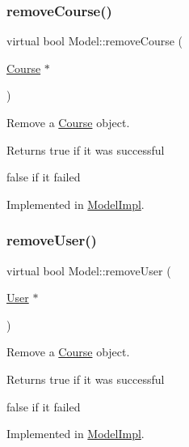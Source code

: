 \mbox{\label{classModel_acc20a58c9a9c7506b06df890e287433e}} 
\subsubsection{\texorpdfstring{remove\+Course()}{removeCourse()}}
{\footnotesize\ttfamily virtual bool Model\+::remove\+Course (\begin{DoxyParamCaption}\item[{\hyperlink{classCourse}{Course} $\ast$}]{ }\end{DoxyParamCaption})\hspace{0.3cm}{\ttfamily [pure virtual]}}



Remove a \hyperlink{classCourse}{Course} object. 

\begin{DoxyReturn}{Returns}
true if it was successful 

false if it failed 
\end{DoxyReturn}


Implemented in \hyperlink{classModelImpl_ae46076a7e4b54d24ba15fb2eb8e7f33d}{Model\+Impl}.

\mbox{\label{classModel_ad217703837ecec908995225f6de1bfca}} 
\subsubsection{\texorpdfstring{remove\+User()}{removeUser()}}
{\footnotesize\ttfamily virtual bool Model\+::remove\+User (\begin{DoxyParamCaption}\item[{\hyperlink{classUser}{User} $\ast$}]{ }\end{DoxyParamCaption})\hspace{0.3cm}{\ttfamily [pure virtual]}}



Remove a \hyperlink{classCourse}{Course} object. 

\begin{DoxyReturn}{Returns}
true if it was successful 

false if it failed 
\end{DoxyReturn}


Implemented in \hyperlink{classModelImpl_a51130aa538cd27b1cac6919cbbef05ee}{Model\+Impl}.

